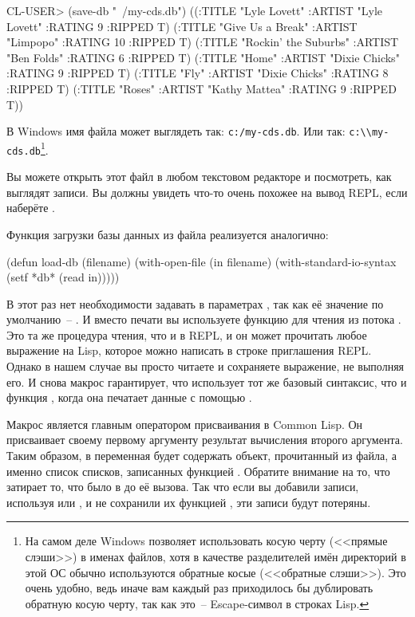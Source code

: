 \begin{myverb}
  CL-USER> (save-db "~/my-cds.db")
  ((:TITLE "Lyle Lovett" :ARTIST "Lyle Lovett" :RATING 9 :RIPPED T)
   (:TITLE "Give Us a Break" :ARTIST "Limpopo" :RATING 10 :RIPPED T)
   (:TITLE "Rockin' the Suburbs" :ARTIST "Ben Folds" :RATING 6 :RIPPED T)
   (:TITLE "Home" :ARTIST "Dixie Chicks" :RATING 9 :RIPPED T)
   (:TITLE "Fly" :ARTIST "Dixie Chicks" :RATING 8 :RIPPED T)
   (:TITLE "Roses" :ARTIST "Kathy Mattea" :RATING 9 :RIPPED T))
\end{myverb}

В Windows имя файла может выглядеть так: \lstinline!c:/my-cds.db!. Или так:
\lstinline!c:\\my-cds.db!\footnote{На самом деле Windows позволяет использовать косую
  черту (<<прямые слэши>>) в именах файлов, хотя в качестве разделителей имён директорий в
  этой ОС обычно используются обратные косые (<<обратные слэши>>). Это очень удобно, ведь
  иначе вам каждый раз приходилось бы дублировать обратную косую черту, так как это~--
  Escape-символ в строках Lisp.}.

Вы можете открыть этот файл в любом текстовом редакторе и посмотреть, как выглядят
записи. Вы должны увидеть что-то очень похожее на вывод REPL, если наберёте .

Функция загрузки базы данных из файла реализуется аналогично:

\begin{myverb}
(defun load-db (filename)
  (with-open-file (in filename)
    (with-standard-io-syntax
      (setf *db* (read in)))))
\end{myverb}

В этот раз нет необходимости задавать  в параметрах
, так как её значение по умолчанию~-- . И вместо
печати вы используете функцию  для чтения из потока . Это та же
процедура чтения, что и в REPL, и он может прочитать любое выражение на Lisp, которое
можно написать в строке приглашения REPL. Однако в нашем случае вы просто читаете и
сохраняете выражение, не выполняя его. И снова макрос 
гарантирует, что  использует тот же базовый синтаксис, что и функция
, когда она печатает данные с помощью .

Макрос  является главным оператором присваивания в Common Lisp. Он
присваивает своему первому аргументу результат вычисления второго аргумента. Таким образом,
в  переменная  будет содержать объект, прочитанный из файла, а
именно список списков, записанных функцией . Обратите внимание на то, что
 затирает то, что было в  до её вызова. Так что если вы добавили
записи, используя  или , и не сохранили их функцией
, эти записи будут потеряны.

